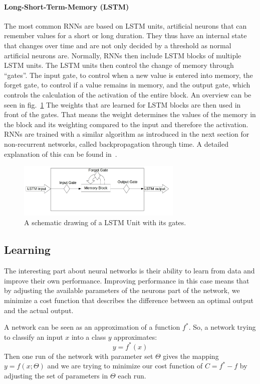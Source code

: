 \paragraph{Long-Short-Term-Memory (LSTM)} The most common RNNs are based on LSTM units, artificial neurons that can remember values for a short or long duration. They thus have an internal state that changes over time and are not only decided by a threshold as normal artificial neurons are. Normally, RNNs then include LSTM blocks of multiple LSTM units. The LSTM units then control the change of memory through ``gates''. The input gate, to control when a new value is entered into memory, the forget gate, to control if a value remains in memory, and the output gate, which controls the calculation of the activation of the entire block. An overview can be seen in fig.~\ref{fig:lstm} The weights that are learned for LSTM blocks are then used in front of the gates. That means the weight determines the values of the memory in the block and its weighting compared to the input and therefore the activation. RNNs are trained with a similar algorithm as introduced in the next section for non-recurrent networks, called backpropagation through time. A detailed explanation of this can be found in~\cite{58337}.


\begin{figure}[!htbp]
\label{fig:lstm}
\caption{A schematic drawing of a LSTM Unit with its gates.}
\centering
\includegraphics[width=0.7\textwidth]{images/lstm.jpg}
\end{figure}

\subsection{Learning}
\label{sec:fund:Learn}
The interesting part about neural networks is their ability to learn from data and improve their own performance. Improving performance in this case means that by adjusting the available parameters of the neurons part of the network, we minimize a cost function that describes the difference between an optimal output and the actual output. 

A network can be seen as an approximation of a function \(f^*\). So, a network trying to classify an input \(x\) into a class \(y\) approximates:
\begin{equation}
\label{eq:learn}
y=f^*(x)
\end{equation}
Then one run of the network with parameter set \(\Theta\) gives the mapping \(y = f(x;\Theta)\) and we are trying to minimize our cost function of \(C= f^* - f\) by adjusting the set of parameters in \(\Theta\) each run.

